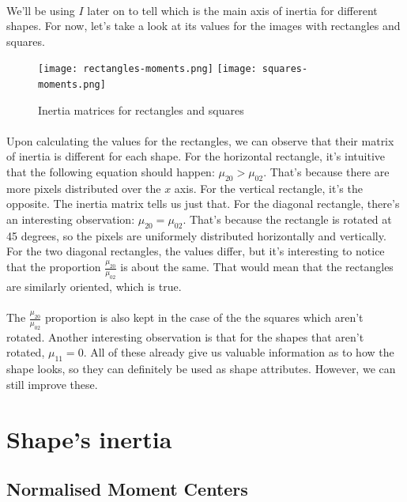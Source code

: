 \clearpage
\paragraph{}
We'll be using $I$ later on to tell which is the main axis of inertia for different shapes.
For now, let's take a look at its values for the images with rectangles and squares.
\begin{figure}[H]
    \centering
    \texttt{[image: rectangles-moments.png]}
    \texttt{[image: squares-moments.png]}
    \caption{Inertia matrices for rectangles and squares}
\end{figure}
\paragraph{}
Upon calculating the values for the rectangles, we can observe that their matrix of inertia is different for each shape.
For the horizontal rectangle, it's intuitive that the following equation should happen: $\mu_{20} > \mu_{02}$.
That's because there are more pixels distributed over the $x$ axis. For the vertical rectangle, it's the opposite.
The inertia matrix tells us just that.
For the diagonal rectangle, there's an interesting observation: $\mu_{20} = \mu_{02}$. That's because the rectangle is rotated at 45 degrees, so the pixels are uniformely distributed horizontally and vertically.
For the two diagonal rectangles, the values differ, but it's interesting to notice that the proportion $\frac{\mu_{20}}{\mu_{02}}$ is about the same. That would mean that the rectangles are similarly oriented, which is true.
\paragraph{}
The $\frac{\mu_{20}}{\mu_{02}}$ proportion is also kept in the case of the the squares which aren't rotated.
Another interesting observation is that for the shapes that aren't rotated, $\mu_{11} = 0$.
All of these already give us valuable information as to how the shape looks, so they can definitely be used as shape attributes.
However, we can still improve these.

\section{Shape's inertia}
\subsection{Normalised Moment Centers}
